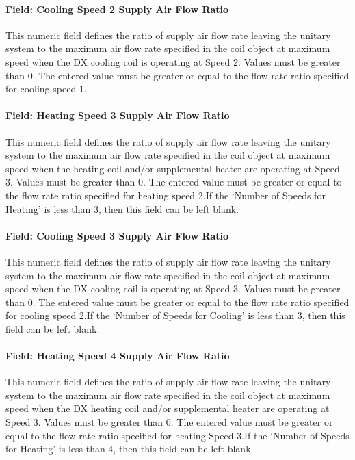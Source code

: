 \paragraph{Field: Cooling Speed 2 Supply Air Flow Ratio}\label{field-cooling-speed-2-supply-air-flow-ratio}

This numeric field defines the ratio of supply air flow rate leaving the unitary system to the maximum air flow rate specified in the coil object at maximum speed when the DX cooling coil is operating at Speed 2. Values must be greater than 0. The entered value must be greater or equal to the flow rate ratio specified for cooling speed 1.

\paragraph{Field: Heating Speed 3 Supply Air Flow Ratio}\label{field-heating-speed-3-supply-air-flow-ratio}

This numeric field defines the ratio of supply air flow rate leaving the unitary system to the maximum air flow rate specified in the coil object at maximum speed when the heating coil and/or supplemental heater are operating at Speed 3. Values must be greater than 0. The entered value must be greater or equal to the flow rate ratio specified for heating speed 2.If the `Number of Speeds for Heating' is less than 3, then this field can be left blank.

\paragraph{Field: Cooling Speed 3 Supply Air Flow Ratio}\label{field-cooling-speed-3-supply-air-flow-ratio}

This numeric field defines the ratio of supply air flow rate leaving the unitary system to the maximum air flow rate specified in the coil object at maximum speed when the DX cooling coil is operating at Speed 3. Values must be greater than 0. The entered value must be greater or equal to the flow rate ratio specified for cooling speed 2.If the `Number of Speeds for Cooling' is less than 3, then this field can be left blank.

\paragraph{Field: Heating Speed 4 Supply Air Flow Ratio}\label{field-heating-speed-4-supply-air-flow-ratio}

This numeric field defines the ratio of supply air flow rate leaving the unitary system to the maximum air flow rate specified in the coil object at maximum speed when the DX heating coil and/or supplemental heater are operating at Speed 3. Values must be greater than 0. The entered value must be greater or equal to the flow rate ratio specified for heating Speed 3.If the `Number of Speeds for Heating' is less than 4, then this field can be left blank.

